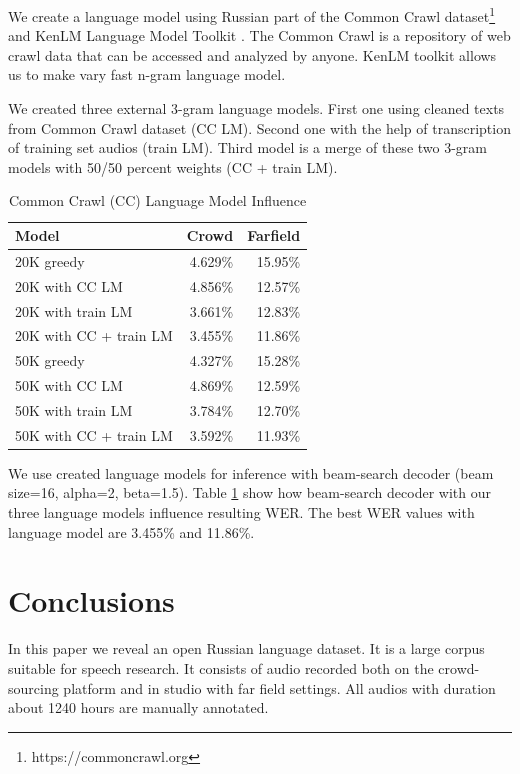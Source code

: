 \documentclass[a4paper]{article}
\begin{document}
We create a language model using Russian part of the Common Crawl dataset\footnote{https://commoncrawl.org} and KenLM Language Model Toolkit \cite{heafield-2011-kenlm}. The Common Crawl is a repository of web crawl data that can be accessed and analyzed by anyone. KenLM toolkit allows us to make vary fast n-gram language model.

We created three external 3-gram language models. First one using cleaned texts from Common Crawl dataset (CC LM). Second one with the help of transcription of training set audios (train LM). Third model is a merge of these two 3-gram models with 50/50 percent weights (CC + train LM).

\begin{table}[t]
  \caption{Common Crawl (CC) Language Model Influence}
  \label{tab:language_model}
  \centering
  \begin{tabular}{lrr}
    \toprule
    \textbf{Model}      & \textbf{Crowd}     & \textbf{Farfield} \\
    \midrule
    20K greedy & 4.629\% & 15.95\%    \\
    20K with CC LM & 4.856\% & 12.57\%   \\
    20K with train LM & 3.661\% & 12.83\%   \\
    20K with CC + train LM & 3.455\% & 11.86\%   \\
    
    \midrule
    50K greedy & 4.327\% & 15.28\%   \\
    50K with CC LM & 4.869\% & 12.59\%   \\
    50K with train LM & 3.784\% & 12.70\%   \\
    50K with CC + train LM & 3.592\% & 11.93\%   \\
    \bottomrule
  \end{tabular}
\end{table}

We use created language models for inference with beam-search decoder (beam size=16, alpha=2, beta=1.5). Table \ref{tab:language_model} show how beam-search decoder with our three language models influence resulting WER. The best WER values with language model are 3.455\% and 11.86\%. 


\section{Conclusions}

In this paper we reveal an open Russian language dataset. It is a large corpus suitable for speech research. It consists of audio recorded both on the crowd-sourcing platform and in studio with far field settings. All audios with duration about 1240 hours are manually annotated. 
\end{document}
